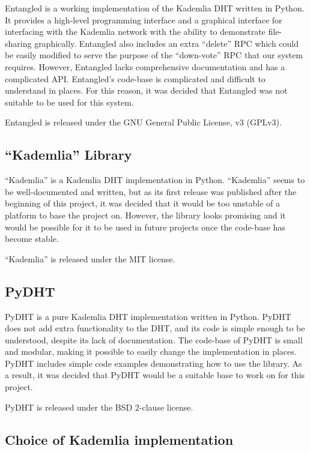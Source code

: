 Entangled is a working implementation of the Kademlia DHT written in Python. It provides a high-level programming interface and
a graphical interface for interfacing with the Kademlia network with the ability to demonstrate file-sharing graphically.
Entangled also includes an extra ``delete'' RPC which could be easily modified to serve the purpose of the ``down-vote'' RPC
that our system requires. However, Entangled lacks comprehensive documentation and has a complicated API.
Entangled's code-base is complicated and difficult to understand in places. For this reason, it was decided that Entangled
was not suitable to be used for this system.

Entangled is released under the GNU General Public License, v3 (GPLv3).

\subsection{``Kademlia'' Library}

``Kademlia'' is a Kademlia DHT implementation in Python. ``Kademlia'' seems to be well-documented and written,
but as its first release was published after the beginning of this project, it was decided that it would be too unstable of
a platform to base the project on.
However, the library looks promising and it would be possible for it to be used in future projects once the code-base
has become stable.

``Kademlia'' is released under the MIT license.

\subsection{PyDHT}

PyDHT is a pure Kademlia DHT implementation written in Python. PyDHT does not add extra functionality to the DHT, and its code
is simple enough to be understood, despite its lack of documentation. The code-base of PyDHT is small and modular, making
it possible to easily change the implementation in places. PyDHT includes simple code examples demonstrating how to use the
library. As a result, it was decided that PyDHT would be a suitable base to work on for this project.

PyDHT is released under the BSD 2-clause license.

\subsection{Choice of Kademlia implementation}

